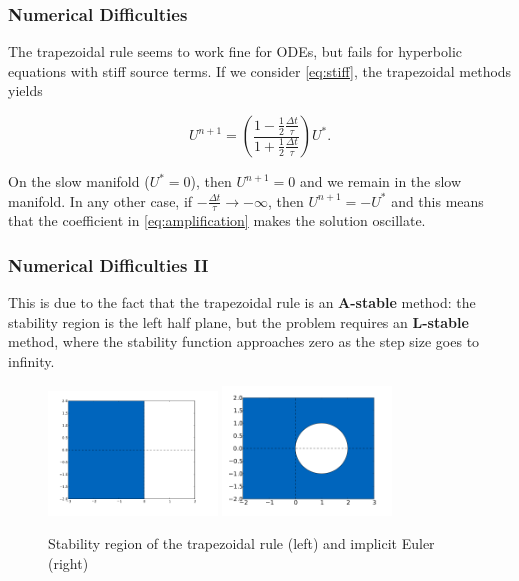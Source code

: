 \documentclass{beamer}
\renewcommand{\d}{\Delta}
\newcommand{\emp}[1]{\textcolor{tum}{\textbf{#1}}}
\begin{document}
\begin{frame}
	\frametitle{Numerical Difficulties}
	The trapezoidal rule seems to work fine for ODEs, but fails for hyperbolic equations with stiff source terms. If we consider \eqref{eq:stiff}, the trapezoidal methods yields

	\begin{equation}\label{eq:amplification}
		U^{n+1} = \left(\frac{1-\frac{1}{2}\frac{\d t}{\tau}}{1+\frac{1}{2}\frac{\d t}{\tau}}\right)U^*.
	\end{equation}

	On the slow manifold ($U^*=0$), then $U^{n+1}=0$ and we remain in the slow manifold. In any other case, if $-\frac{\d t}{\tau}\rightarrow-\infty$, then $U^{n+1}=-U^*$ and this means that the coefficient in \eqref{eq:amplification} makes the solution oscillate.
\end{frame}

\begin{frame}
	\frametitle{Numerical Difficulties II}

	This is due to the fact that the trapezoidal rule is an \emp{A-stable} method: the stability region is the left half plane, but the problem requires an \emp{L-stable} method, where the stability function approaches zero as the step size goes to infinity.

	\begin{figure}[!ht]
		\centering
		\includegraphics[width=0.4\textwidth]{TrapezoidalStability.png}%
		\label{fig:TrapezoidalStability}
		\includegraphics[width=0.4\textwidth]{EulerStability.png}%
		\label{fig:EulerStability}

		\caption{Stability region of the trapezoidal rule (left) and implicit Euler  (right)}
		\label{fi:stability}
	\end{figure}
\end{frame}
\end{document}
